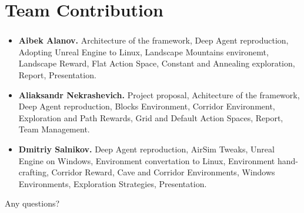 \documentclass[t]{beamer}
\begin{document}
\section{Team Contribution}
\begin{frame}
	\frametitle{\insertsection}
	\begin{itemize}
    \item {\bf Aibek Alanov.} Architecture of the framework, Deep Agent reproduction,
        Adopting Unreal Engine to Linux, Landscape Mountains environemt,
        Landscape Reward, Flat Action Space, Constant and Annealing exploration,
        Report, Presentation.

    \item {\bf Aliaksandr Nekrashevich.} Project proposal, Achitecture of
        the framework, Deep Agent reproduction, Blocks Environment,
        Corridor Environment, Exploration and Path Rewards,
        Grid and Default Action Spaces, Report, Team Management.

    \item {\bf Dmitriy Salnikov.} Deep Agent reproduction, AirSim Tweaks,
        Unreal Engine on Windows, Environment convertation to Linux,
        Environment hand-crafting, Corridor Reward, Cave and Corridor
        Environments, Windows Environments, Exploration Strategies,
        Presentation.
\end{itemize}
\end{frame}

\begin{frame}
	\begin{center}
		{\huge\alert{Any questions?}}
	\end{center}
\end{frame}
\end{document}
